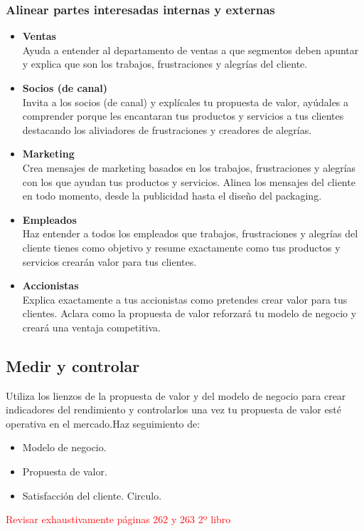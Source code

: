 \documentclass[11pt]{book}
\begin{document}
\subsubsection{Alinear partes interesadas internas y externas}
\begin{itemize}
\item \textbf{ Ventas }\\
Ayuda a entender al departamento de ventas a que segmentos deben apuntar y explica que son los trabajos, frustraciones y alegrías del cliente.
\item \textbf{ Socios (de canal) }\\
Invita a los socios (de canal) y explícales tu propuesta de valor, ayúdales a comprender porque les encantaran tus productos y servicios a tus clientes destacando los aliviadores de frustraciones y creadores de alegrías.
\item \textbf{ Marketing }\\
Crea mensajes de marketing basados en los trabajos, frustraciones y alegrías con los que ayudan tus productos y servicios. Alinea los mensajes del cliente en todo momento, desde la publicidad hasta el diseño del packaging.
\item \textbf{ Empleados }\\
Haz entender a todos los empleados que trabajos, frustraciones y alegrías del cliente tienes como objetivo y resume exactamente como tus productos y servicios crearán valor para tus clientes.
\item \textbf{ Accionistas }\\
Explica exactamente a tus accionistas como pretendes crear valor para tus clientes. Aclara como la propuesta de valor reforzará tu modelo de negocio y creará una ventaja competitiva.
\end{itemize}
\subsection{Medir y controlar}
Utiliza los lienzos de la propuesta de valor y del modelo de negocio para crear indicadores del rendimiento y controlarlos una vez tu propuesta de valor esté operativa en el mercado.Haz seguimiento de:
\begin{itemize}
\item Modelo de negocio.
\item Propuesta de valor.
\item Satisfacción del cliente. Circulo.
\end{itemize}
\textcolor{red}{Revisar exhaustivamente páginas 262 y  263 2º libro}
\end{document}
